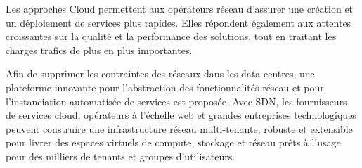 Les approches Cloud permettent aux opérateurs réseau d'assurer une création et un déploiement de services plus rapides. Elles répondent également aux attentes croissantes sur la qualité et la performance des solutions, tout en traitant les charges trafics de plus en plus importantes.



Afin de supprimer les contraintes des réseaux dans les data centres, une plateforme innovante pour l'abstraction des fonctionnalités réseau et pour l'instanciation automatisée de services est proposée. Avec SDN, les fournisseurs de services cloud, opérateurs à l'échelle web et grandes entreprises technologiques peuvent construire une infrastructure réseau multi-tenante, robuste et extensible pour livrer des espaces virtuels de compute, stockage et réseau prêts à l'usage pour des milliers de tenants et groupes d'utilisateurs.



